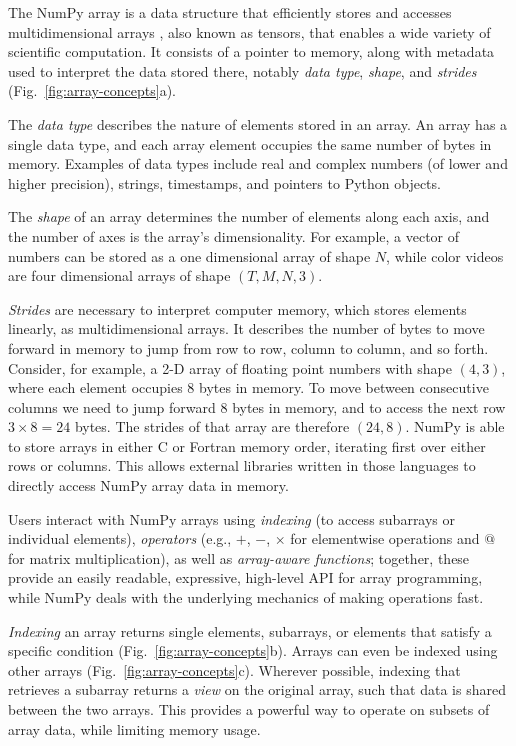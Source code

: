 The NumPy array is a data structure that efficiently stores and accesses
multidimensional arrays \cite{vanderwalt2011numpy}, also known as tensors, that
enables a wide variety of scientific computation.
It consists of a pointer to memory, along with metadata used to interpret the
data stored there, notably {\em data type}, {\em shape}, and {\em strides}
(Fig.~\ref{fig:array-concepts}a).

The \emph{data type} describes the nature of elements stored in an array.
An array has a single data type, and each array element occupies the same
number of bytes in memory.
Examples of data types include real and complex numbers (of lower and higher
precision), strings, timestamps, and pointers to Python objects.

The \emph{shape} of an array determines the number of elements along each axis,
and the number of axes is the array's dimensionality.
For example, a vector of numbers can be stored as a one dimensional array of
shape $N$, while color videos are four dimensional arrays of shape
$(T, M, N, 3)$.

\emph{Strides} are necessary to interpret computer memory, which stores elements
linearly, as multidimensional arrays.
It describes the number of bytes to move forward in memory to jump from row to
row, column to column, and so forth.
Consider, for example, a 2-D array of floating point numbers with shape
$(4, 3)$, where each element occupies 8 bytes in memory.
To move between consecutive columns we need to jump forward 8 bytes in memory,
and to access the next row $3 \times 8 = 24$ bytes.
The strides of that array are therefore $(24, 8)$.  NumPy is able to
store arrays in either C or Fortran memory order, iterating
first over either rows or columns.  This allows external libraries
written in those languages to directly access NumPy array data in memory.

Users interact with NumPy arrays using {\em indexing} (to access
subarrays or individual elements), {\em operators} (e.g., $+$, $-$, $\times$
for elementwise operations and $@$ for matrix multiplication), as well as {\em array-aware functions};
together, these provide an easily readable, expressive, high-level API for
array programming, while NumPy
deals with the underlying mechanics of making operations fast.

\emph{Indexing} an array returns single elements, subarrays, or elements that satisfy
a specific condition (Fig.~\ref{fig:array-concepts}b).
Arrays can even be indexed using other arrays (Fig.~\ref{fig:array-concepts}c).
Wherever possible, indexing that retrieves a subarray returns a {\em view} on
the original array, such that data is shared between the two arrays.
This provides a powerful way to operate on subsets of array data, while
limiting memory usage.


